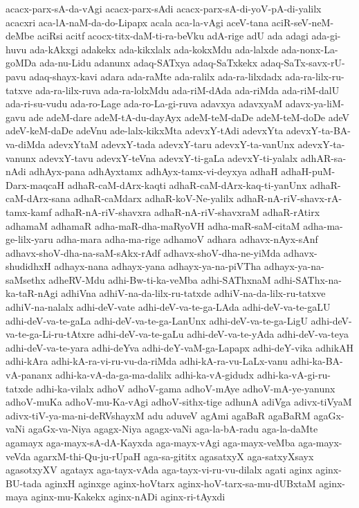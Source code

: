 {acacx-parx-sA-da-vAgi
acacx-parx-sAdi
acacx-parx-sA-di-yoV-pA-di-yalilx
acacxri
aca-lA-naM-da-do-Lipapx
acala
aca-la-vAgi
aceV-tana
aciR-seV-neM-deMbe
aciRsi
acitf
acocx-titx-daM-ti-ra-beVku
adA-rige
adU
ada
adagi
ada-gi-huvu
ada-kAkxgi
adakekx
ada-kikxlalx
ada-kokxMdu
ada-lalxde
ada-nonx-La-goMDa
ada-nu-Lidu
adanunx
adaq-SATxya
adaq-SaTxkekx
adaq-SaTx-savx-rU-pavu
adaq-shayx-kavi
adara
ada-raMte
ada-ralilx
ada-ra-lilxdadx
ada-ra-lilx-ru-tatxve
ada-ra-lilx-ruva
ada-ra-lolxMdu
ada-riM-dAda
ada-riMda
ada-riM-dalU
ada-ri-su-vudu
ada-ro-Lage
ada-ro-La-gi-ruva
adavxya
adavxyaM
adavx-ya-liM-gavu
ade
adeM-dare
adeM-tA-du-dayAyx
adeM-teM-daDe
adeM-teM-doDe
adeV
adeV-keM-daDe
adeVnu
ade-lalx-kikxMta
adevxY-tAdi
adevxYta
adevxY-ta-BA-va-diMda
adevxYtaM
adevxY-tada
adevxY-taru
adevxY-ta-vanUnx
adevxY-ta-vanunx
adevxY-tavu
adevxY-teVna
adevxY-ti-gaLa
adevxY-ti-yalalx
adhAR-sa-nAdi
adhAyx-pana
adhAyxtamx
adhAyx-tamx-vi-deyxya
adhaH
adhaH-puM-Darx-maqcaH
adhaR-caM-dArx-kaqti
adhaR-caM-dArx-kaq-ti-yanUnx
adhaR-caM-dArx-sana
adhaR-caMdarx
adhaR-koV-Ne-yalilx
adhaR-nA-riV-shavx-rA-tamx-kamf
adhaR-nA-riV-shavxra
adhaR-nA-riV-shavxraM
adhaR-rAtirx
adhamaM
adhamaR
adha-maR-dha-maRyoVH
adha-maR-saM-citaM
adha-ma-ge-lilx-yaru
adha-mara
adha-ma-rige
adhamoV
adhara
adhavx-nAyx-sAnf
adhavx-shoV-dha-na-saM-sAkx-rAdf
adhavx-shoV-dha-ne-yiMda
adhavx-shudidhxH
adhayx-nana
adhayx-yana
adhayx-ya-na-piVTha
adhayx-ya-na-saMsethx
adheRV-Mdu
adhi-Bw-ti-ka-veMba
adhi-SAThxnaM
adhi-SAThx-na-ka-taR-nAgi
adhiVna
adhiV-na-da-lilx-ru-tatxde
adhiV-na-da-lilx-ru-tatxve
adhiV-na-nalalx
adhi-deV-vate
adhi-deV-va-te-ga-LAda
adhi-deV-va-te-gaLU
adhi-deV-va-te-gaLa
adhi-deV-va-te-ga-LanUnx
adhi-deV-va-te-ga-LigU
adhi-deV-va-te-ga-Li-ru-tAtxre
adhi-deV-va-te-gaLu
adhi-deV-va-te-yAda
adhi-deV-va-teya
adhi-deV-va-te-yara
adhi-deYva
adhi-deY-vaM-ga-Lapapx
adhi-deY-vika
adhikAH
adhi-kAra
adhi-kA-ra-vi-ru-vu-da-riMda
adhi-kA-ra-vu-LaLx-vanu
adhi-ka-BA-vA-pananx
adhi-ka-vA-da-ga-ma-dalilx
adhi-ka-vA-gidudx
adhi-ka-vA-gi-ru-tatxde
adhi-ka-vilalx
adhoV
adhoV-gama
adhoV-mAye
adhoV-mA-ye-yanunx
adhoV-muKa
adhoV-mu-Ka-vAgi
adhoV-sithx-tige
adhunA
adiVga
adivx-tiVyaM
adivx-tiV-ya-ma-ni-deRVshayxM
adu
aduveV
agAmi
agaBaR
agaBaRM
agaGx-vaNi
agaGx-va-Niya
agagx-Niya
agagx-vaNi
aga-la-bA-radu
aga-la-daMte
agamayx
aga-mayx-sA-dA-Kayxda
aga-mayx-vAgi
aga-mayx-veMba
aga-mayx-veVda
agarxM-thi-Qu-ju-rUpaH
aga-sa-gititx
agasatxyX
aga-satxyXsayx
agasotxyXV
agatayx
aga-tayx-vAda
aga-tayx-vi-ru-vu-dilalx
agati
aginx
aginx-BU-tada
aginxH
aginxge
aginx-hoVtarx
aginx-hoV-tarx-sa-mu-dUBxtaM
aginx-maya
aginx-mu-Kakekx
aginx-nADi
aginx-ri-tAyxdi
}
